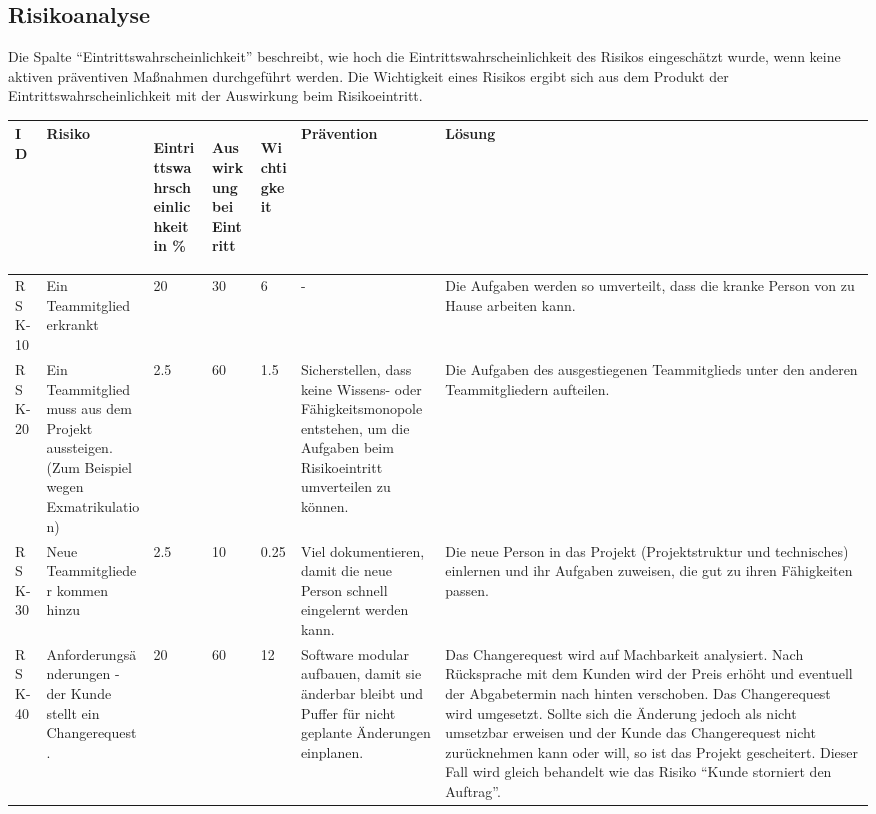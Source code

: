 \begin{landscape}
\chapter{Risikoanalyse}
	Die Spalte \enquote{Eintrittswahrscheinlichkeit} beschreibt, wie hoch die Eintrittswahrscheinlichkeit des Risikos eingeschätzt wurde, wenn keine aktiven präventiven Maßnahmen durchgeführt werden.
	Die Wichtigkeit eines Risikos ergibt sich aus dem Produkt der Eintrittswahrscheinlichkeit mit der Auswirkung beim Risikoeintritt.
	\begin{longtable}{|p{1.5cm}|p{4.5cm}|p{0.4cm}|p{0.4cm}|p{0.8cm}|p{4.5cm}|p{4.5cm}|}

		\hline
		\textbf{ID}
			& \textbf{Risiko} 
				& \begin{turn}{90}\textbf{Eintrittswahrscheinlichkeit in \%}\end{turn}
					& \begin{turn}{90}\textbf{Auswirkung bei Eintritt}\end{turn}
						& \begin{turn}{90}\textbf{Wichtigkeit}\end{turn} 
							& \textbf{Prävention} 
								& \textbf{Lösung} 
		\\ \hline

		RSK-10 	& Ein Teammitglied erkrankt
				& 20 	& 30 	& 6 	& - 	& Die Aufgaben werden so umverteilt, dass die kranke Person von zu Hause arbeiten kann. 

		\\ \hline

		RSK-20 	& Ein Teammitglied muss aus dem Projekt aussteigen. (Zum Beispiel wegen Exmatrikulation)
				& 2.5 	& 60 	& 1.5 	& Sicherstellen, dass keine Wissens- oder Fähigkeitsmonopole entstehen, um die Aufgaben beim Risikoeintritt umverteilen zu können.
								& Die Aufgaben des ausgestiegenen Teammitglieds unter den anderen Teammitgliedern aufteilen.

		\\ \hline

		RSK-30 	& Neue Teammitglieder kommen hinzu
				& 2.5 	& 10 	& 0.25 	& Viel dokumentieren, damit die neue Person schnell eingelernt werden kann.
								& Die neue Person in das Projekt (Projektstruktur und technisches) einlernen und ihr Aufgaben zuweisen, die gut zu ihren Fähigkeiten passen.

		\\ \hline

		RSK-40 	& Anforderungsänderungen - der Kunde stellt ein Changerequest.
				& 20	& 60 	& 12	& Software modular aufbauen, damit sie änderbar bleibt und Puffer für nicht geplante Änderungen einplanen.
								& Das Changerequest wird auf Machbarkeit analysiert. Nach Rücksprache mit dem Kunden wird der Preis erhöht und eventuell der Abgabetermin nach hinten verschoben. Das Changerequest wird umgesetzt. Sollte sich die Änderung jedoch als nicht umsetzbar erweisen und der Kunde das Changerequest nicht zurücknehmen kann oder will, so ist das Projekt gescheitert. Dieser Fall wird gleich behandelt wie das Risiko \enquote{Kunde storniert den Auftrag}.


\end{longtable}
\end{landscape}
